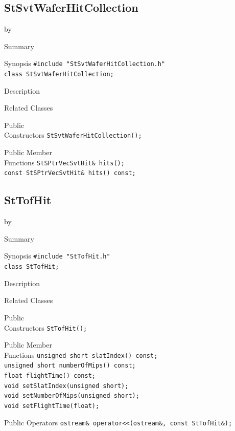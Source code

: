 \documentclass[twoside]{article}
\newcommand{\entrylabel}[1]{\mbox{\textbf{{#1}}}\hfil}%
\newenvironment{entry}
{\begin{list}{}%
    {\renewcommand{\makelabel}{\entrylabel}%
     \setlength{\labelwidth}{90pt}%
     \setlength{\leftmargin}{\labelwidth}
     \advance\leftmargin by \labelsep%
      }%
    }%
  {\end{list}}
\newcommand{\Entrylabel}[1]%
{\raisebox{0pt}[1ex][0pt]{\makebox[\labelwidth][l]%
    {\parbox[t]{\labelwidth}{\hspace{0pt}\textbf{{#1}}}}}}
\newenvironment{Entry}%
{\renewcommand{\entrylabel}{\Entrylabel}\begin{entry}}%
  {\end{entry}}
\begin{document}
\subsection{StSvtWaferHitCollection}
\label{sec:StSvtWaferHitCollection}
\begin{Entry}
\item[Summary]
\item[Synopsis]
    \verb+#include "StSvtWaferHitCollection.h"+\\
    \verb+class StSvtWaferHitCollection;+\\
\item[Description]
\item[Related Classes]
\item[Public\\ Constructors]
    \verb+StSvtWaferHitCollection();+\\
\item[Public Member\\ Functions]
    \verb+StSPtrVecSvtHit& hits();+\\
    \verb+const StSPtrVecSvtHit& hits() const;+\\
\end{Entry}
\clearpage

\subsection{StTofHit}
\label{sec:StTofHit}
\begin{Entry}
\item[Summary]
\item[Synopsis]
    \verb+#include "StTofHit.h"+\\
    \verb+class StTofHit;+\\
\item[Description]
\item[Related Classes]
\item[Public\\ Constructors]
    \verb+StTofHit();+\\
\item[Public Member\\ Functions]
    \verb+unsigned short slatIndex() const;+\\
    \verb+unsigned short numberOfMips() const;+\\
    \verb+float flightTime() const;+\\
    \verb+void setSlatIndex(unsigned short);+\\
    \verb+void setNumberOfMips(unsigned short);+\\
    \verb+void setFlightTime(float);+\\
\item[Public Operators]
    \verb+ostream& operator<<(ostream&, const StTofHit&);+\\
\end{Entry}
\clearpage
\end{document}
